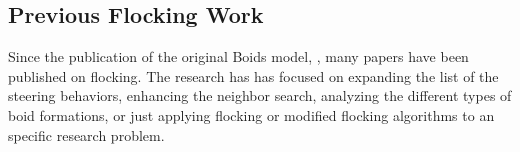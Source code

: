 
\subsection{Previous Flocking Work}\label{currentwork}
Since the publication of the original Boids model, , many papers have been published on flocking.  The research has  has focused on expanding the list of the steering behaviors, enhancing the neighbor search, analyzing the different types of  boid formations, or just applying flocking or modified flocking algorithms to an specific research problem.

